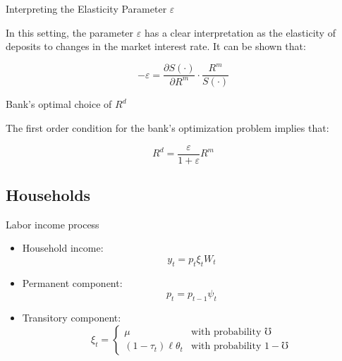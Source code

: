 \documentclass{beamer}
\begin{document}
\begin{frame}[label=epsilonslide]{Interpreting the Elasticity Parameter $\varepsilon$}

\small
\par In this setting, the parameter $\varepsilon$ has a clear interpretation as the elasticity of deposits to changes in the market interest rate. It can be shown that:

\[
-\varepsilon = \frac{\partial S(\cdot)}{\partial R^m} \cdot \frac{R^m}{S(\cdot)}
\]

\vspace{1em}
\hyperlink{bankmodel}{}

\vspace{1em}
\hyperlink{focslide}{}

\end{frame}

\begin{frame}[label=focslide]{Bank's optimal choice of  $R^d$}

\small
\par  The first order condition for the bank's optimization problem implies that:

\[
R^d  = \frac{\varepsilon}{1+ \varepsilon} R^m 
\]

\vspace{1em}
\hyperlink{bankmodel}{}

\end{frame}

  
\subsection{Households}

\small
\begin{frame}{Labor income process}

\begin{itemize}
\item Household income: $$y_t = p_t \xi_t W_t$$
\item Permanent component: $$p_t = p_{t-1} \psi_t$$
\item Transitory component: $$\xi_t =
    \begin{cases}
       \mu & \text{with probability $\mho$} \\
      (1-\tau_t) \ell \theta_t & \text{with probability $1-\mho$}
   \end{cases}$$
\end{itemize}

\end{frame}
\end{document}
